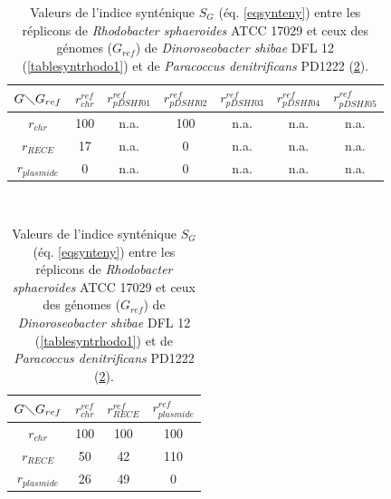 \begin{table}[H]
		\begin{center}
		\caption[Valeurs de l'indice synténique pour \textit{Rhodobacter}]{Valeurs de l'indice synténique $S_{G}$ (éq. \ref{eqsynteny}) entre les réplicons de \textit{Rhodobacter sphaeroides} ATCC 17029 et ceux des génomes  ($G_{ref}$) de \textit{Dinoroseobacter shibae} DFL 12 (\ref{tablesyntrhodo1}) et de \textit{Paracoccus denitrificans} PD1222 (\ref{tablesyntrhodo2}).} \label{tablesyntrhodo}
				\label{tablesyntrhodo1}
				\begin{tabular}{c|cccccc}
					$G \diagdown G_{ref}$ & $r^{ref}_{chr}$ & $r^{ref}_{pDSHI01}$ & $r^{ref}_{pDSHI02}$ & $r^{ref}_{pDSHI03}$ & $r^{ref}_{pDSHI04}$ & $r^{ref}_{pDSHI05}$\\
					\hline
					$r_{chr}$ & 100 & n.a. & 100 & n.a. & n.a. & n.a.\\
					$r_{RECE}$ & 17 & n.a. & 0 & n.a. & n.a. & n.a.\\
					$r_{plasmide}$ & 0 & n.a. & 0 & n.a. & n.a. & n.a.\\ 
				\end{tabular}
				\\\vspace{0.5cm}
				\label{tablesyntrhodo2}
				\begin{tabular}{c|ccc}
					$G \diagdown G_{ref}$ & $r^{ref}_{chr}$ & $r^{ref}_{RECE}$ & $r^{ref}_{plasmide}$\\
					\hline
					$r_{chr}$ & 100 & 100 & 100\\
					$r_{RECE}$ & 50 & 42 & 110\\
					$r_{plasmide}$ & 26 & 49 & 0\\ 
				\end{tabular}
		\end{center}
\end{table} 
    
